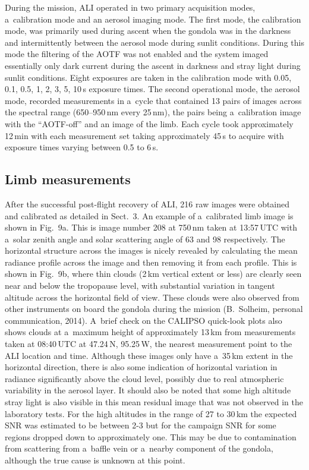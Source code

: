 \documentclass[amtd, online, hvmath]{copernicus}
\begin{document}
During the mission, ALI operated in two primary acquisition modes,
a~calibration mode and an aerosol imaging mode. The first mode, the
calibration mode, was primarily used during ascent when the gondola
was in the darkness and intermittently between the aerosol mode during
sunlit conditions. During this mode the filtering of the AOTF was not
enabled and the system imaged essentially only dark current during the
ascent in darkness and stray light during sunlit conditions. Eight
exposures are taken in the calibration mode with 0.05, 0.1, 0.5, 1, 2,
3, 5, 10\,s exposure times. The second operational mode, the aerosol
mode, recorded measurements in a~cycle that contained 13 pairs of
images across the spectral range (650--950\,\unit{nm} every
25\,\unit{nm}), the pairs being a~calibration image with the
``AOTF-off'' and an image of the limb. Each cycle took approximately
12\,min with each measurement set taking approximately 45\,s to
acquire with exposure times varying between 0.5 to 6\,s.

\subsection{Limb measurements}

After the successful post-flight recovery of ALI, 216 raw images were
obtained and calibrated as detailed in Sect.~3. An example of a~calibrated
limb image is shown in Fig.~9a. This is image number 208 at 750\,\unit{nm}
taken at 13:57\,UTC with a~solar zenith angle and solar scattering angle of
63 and 98{\degree} respectively. The horizontal structure across the images
is nicely revealed by calculating the mean radiance profile across the image
and then removing it from each profile. This is shown in Fig.~9b, where thin
clouds (2\,\unit{km} vertical extent or less) are clearly seen near and below
the tropopause level, with substantial variation in tangent altitude across
the horizontal field of view. These clouds were also observed from other
instruments on board the gondola during the mission (B.~Solheim, personal
communication, 2014). A~brief check on the CALIPSO quick-look plots also
shows clouds at a~maximum height of approximately 13\,\unit{km} from
measurements taken at 08:40\,UTC at 47.24{\degree}\,N, 95.25{\degree}\,W, the
nearest measurement point to the ALI location and time. Although these images
only have a~35\,\unit{km} extent in the horizontal direction, there is also
some indication of horizontal variation in radiance significantly above the
cloud level, possibly due to real atmospheric variability in the aerosol
layer. It should also be noted that some high altitude stray light is also
visible in this mean residual image that was not observed in the laboratory
tests. For the high altitudes in the range of 27 to 30\,\unit{km} the expected SNR was estimated to be between 2-3 but for the campaign SNR for some regions dropped down to approximately one. This may be due to contamination from scattering from a~baffle vein or
a~nearby component of the gondola, although the true cause is unknown at this
point.
\end{document}
